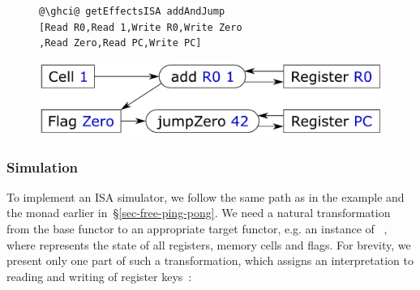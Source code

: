 \vspace{-1mm}
\begin{figure}[!h]
 \begin{minipage}{0.46\textwidth}
\raggedleft
\begin{verbatim}
@\ghci@ getEffectsISA addAndJump
[Read R0,Read 1,Write R0,Write Zero
,Read Zero,Read PC,Write PC]
\end{verbatim}
 \end{minipage}
 \begin{minipage}{0.50\textwidth}
  \centering
  \includegraphics[scale=0.3]{fig/addAndJump.pdf}
 \end{minipage}
\end{figure}
\vspace{-1mm}


\subsubsection{Simulation}

To implement an ISA simulator, we follow the same path as in the 
example and the  monad earlier in~\S\ref{sec-free-ping-pong}. We need a
natural transformation from the base functor  to an appropriate target
functor, e.g. an instance of ~, where 
represents the state of all registers, memory cells and flags. For brevity, we
present only one part of such a transformation, which assigns an interpretation
to reading and writing of register keys~:


